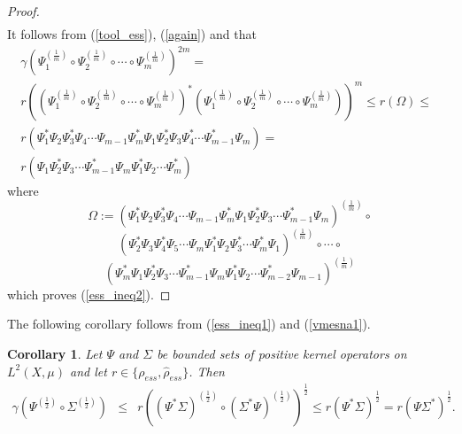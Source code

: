 \documentclass[12pt, reqno]{amsart}
\newtheorem{corollary}[theorem]{Corollary}
\theoremstyle{definition}
\theoremstyle{remark}
\numberwithin{equation}{section}
\begin{document}
\begin{proof}
\begin{align}
\end{align}
It follows  from (\ref{tool_ess}), (\ref{again}) and \cite[Theorem 3.2(i)]{BP22b} 
that
\begin{align}
\nonumber
\gamma (\Psi_1^{(\frac{1}{m})}\circ\Psi_2^{(\frac{1}{m})}\circ\cdots\circ\Psi_m^{(\frac{1}{m})})^{2m}=\;\;\;\;\;\;\;\;\;\;\;\;\;\;\;\;\;\;\;\;\;\;\;\;\;\;\;\;\;\;\;\;\;\;\;\;\;\;\;\;\;\;\;\;\;\;\;\;\;\;\;\;\;\;\;\;\;\;\;\;\\
\nonumber
r\left(\left(\Psi_1^{(\frac{1}{m})}\circ\Psi_2^{(\frac{1}{m})}\circ\cdots\circ\Psi_m^{(\frac{1}{m})}\right)^*\left(\Psi_1^{(\frac{1}{m})}\circ\Psi_2^{(\frac{1}{m})}\circ\cdots\circ\Psi_m^{(\frac{1}{m})}\right)\right)^m\le r(\Omega) \le \;\;\\
\nonumber
r(\Psi_1^*\Psi_2\Psi_3^*\Psi_4\cdots\Psi_{m-1}\Psi_m^*\Psi_1\Psi_2^*\Psi_3\Psi_4^*\cdots\Psi_{m-1}^*\Psi_m)=\;\;\;\;\;\;\;\;\;\;\;\;\;\;\;\;\;\;\;\;\;\;\;\;\;\;\;\;\\
\nonumber
r(\Psi_1\Psi_2^*\Psi_3\cdots\Psi_{m-1}^*\Psi_m\Psi_1^*\Psi_2\cdots\Psi_m^*)\;\;\;\;\;\;\;\;\;\;\;\;\;\;\;\;\;\;\;\;\;\;\;\;\;\;\;\;\;\;\;\;\;\;\;\;\;\;\;\;\;\;\;\;\;\;\;\;\;\;\;\;\;
\end{align}
where
$$\Omega:=(\Psi_1^*\Psi_2\Psi_3^*\Psi_4\cdots\Psi_{m-1}\Psi_m^*\Psi_1\Psi_2^*\Psi_3\cdots\Psi_{m-1}^*\Psi_m)^{(\frac{1}{m})}\circ$$
$$(\Psi_2^*\Psi_3\Psi_4^*\Psi_5\cdots\Psi_m\Psi_1^*\Psi_2\Psi_3^*\cdots\Psi_m^*\Psi_1)^{(\frac{1}{m})}\circ\cdots\circ$$
$$(\Psi_m^*\Psi_1\Psi_2^*\Psi_3\cdots\Psi_{m-1}^*\Psi_m\Psi_1^*\Psi_2\cdots\Psi_{m-2}^*\Psi_{m-1})^{(\frac{1}{m})}$$
which proves (\ref{ess_ineq2}).
\end{proof}
The following corollary follows from (\ref{ess_ineq1}) and  (\ref{vmesna1}).
\begin{corollary} Let $\Psi$ and $\Sigma$ be bounded sets of positive kernel operators on $L^2(X, \mu)$  and let  $r \in\{\rho _{ess},\hat{\rho} _{ess}\}$. Then
\begin{eqnarray}
\nonumber
\gamma (\Psi ^{(\frac{1}{2})} \circ  \Sigma^{(\frac{1}{2})} ) &\le& r  \left ( (\Psi^* \Sigma) ^{(\frac{1}{2})}\circ (\Sigma ^* \Psi)^{(\frac{1}{2})}\right)^{\frac{1}{2}}\le r (\Psi^* \Sigma )^{\frac{1}{2}} =
r  \left (\Psi \Sigma ^* \right)^{\frac{1}{2}}  . %
\end{eqnarray}
\end{corollary}
\end{document}
